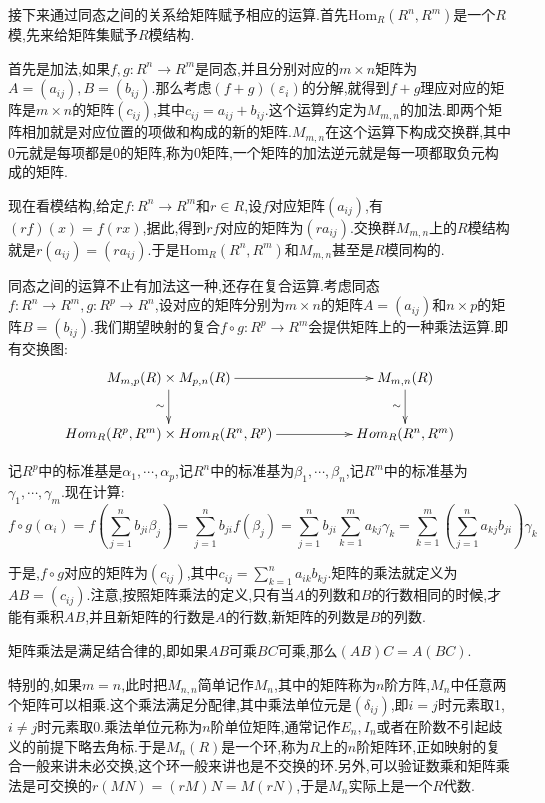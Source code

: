 接下来通过同态之间的关系给矩阵赋予相应的运算.首先$\mathrm{Hom}_R(R^n,R^m)$是一个$R$模,先来给矩阵集赋予$R$模结构.

首先是加法,如果$f,g:R^n\to R^m$是同态,并且分别对应的$m\times n$矩阵为$A=(a_{ij}),B=(b_{ij})$.那么考虑$(f+g)(\varepsilon_i)$的分解,就得到$f+g$理应对应的矩阵是$m\times n$的矩阵$(c_{ij})$,其中$c_{ij}=a_{ij}+b_{ij}$.这个运算约定为$M_{m,n}$的加法.即两个矩阵相加就是对应位置的项做和构成的新的矩阵.$M_{m,n}$在这个运算下构成交换群,其中0元就是每项都是0的矩阵,称为0矩阵,一个矩阵的加法逆元就是每一项都取负元构成的矩阵.

现在看模结构,给定$f:R^n\to R^m$和$r\in R$,设$f$对应矩阵$(a_{ij})$,有$(rf)(x)=f(rx)$,据此,得到$rf$对应的矩阵为$(ra_{ij})$.交换群$M_{m,n}$上的$R$模结构就是$r(a_{ij})=(ra_{ij})$.于是$\mathrm{Hom}_R(R^n,R^m)$和$M_{m,n}$甚至是$R$模同构的.

同态之间的运算不止有加法这一种,还存在复合运算.考虑同态$f:R^n\to R^m,g:R^p\to R^n$,设对应的矩阵分别为$m\times n$的矩阵$A=(a_{ij})$和$n\times p$的矩阵$B=(b_{ij})$.我们期望映射的复合$f\circ g:R^p\to R^m$会提供矩阵上的一种乘法运算.即有交换图:
$$\xymatrix{
	M_{m,p}(R)\times M_{p,n}(R)\ar[rr]\ar[d]_{\sim}&&M_{m,n}(R)\ar[d]_{\sim}\\
	Hom_R(R^p,R^m)\times Hom_R(R^n,R^p)\ar[rr]&&Hom_R(R^n,R^m)
}$$

记$R^p$中的标准基是$\alpha_1,\cdots,\alpha_p$,记$R^n$中的标准基为$\beta_1,\cdots,\beta_n$,记$R^m$中的标准基为$\gamma_1,\cdots,\gamma_m$.现在计算:
$$f\circ g(\alpha_i) =f\left(\sum_{j=1}^nb_{ji}\beta_j\right)
=\sum_{j=1}^nb_{ji}f(\beta_j)
=\sum_{j=1}^nb_{ji}\sum_{k=1}^ma_{kj}\gamma_k
=\sum_{k=1}^m\left(\sum_{j=1}^na_{kj}b_{ji}\right)\gamma_k$$

于是,$f\circ g$对应的矩阵为$(c_{ij})$,其中$c_{ij}=\sum_{k=1}^na_{ik}b_{kj}$.矩阵的乘法就定义为$AB=(c_{ij})$.注意,按照矩阵乘法的定义,只有当$A$的列数和$B$的行数相同的时候,才能有乘积$AB$,并且新矩阵的行数是$A$的行数,新矩阵的列数是$B$的列数.

矩阵乘法是满足结合律的,即如果$AB$可乘$BC$可乘,那么$(AB)C=A(BC)$.

特别的,如果$m=n$,此时把$M_{n,n}$简单记作$M_n$,其中的矩阵称为$n$阶方阵,$M_n$中任意两个矩阵可以相乘.这个乘法满足分配律,其中乘法单位元是$(\delta_{ij})$,即$i=j$时元素取1,$i\not=j$时元素取0.乘法单位元称为$n$阶单位矩阵,通常记作$E_n,I_n$或者在阶数不引起歧义的前提下略去角标.于是$M_n(R)$是一个环,称为$R$上的$n$阶矩阵环,正如映射的复合一般来讲未必交换,这个环一般来讲也是不交换的环.另外,可以验证数乘和矩阵乘法是可交换的$r(MN)=(rM)N=M(rN)$,于是$M_n$实际上是一个$R$代数.

